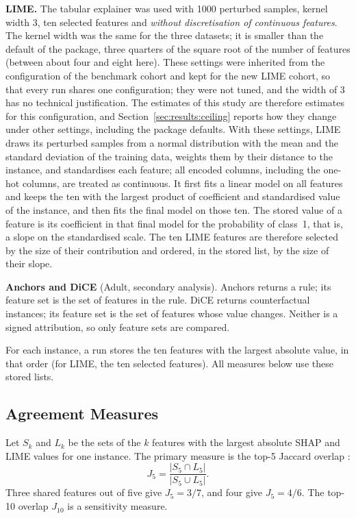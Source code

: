 \textbf{LIME.} The tabular explainer \cite{ribeiro2016why} was used with 1000 perturbed
samples, kernel width 3, ten selected features and \emph{without discretisation of
continuous features}. The kernel width was the same for the three datasets; it is smaller
than the default of the package, three quarters of the square root of the number of
features (between about four and eight here). These settings were inherited from the
configuration of the benchmark cohort and kept for the new LIME cohort, so that every run
shares one configuration; they were not tuned, and the width of 3 has no technical
justification. The estimates of this study are therefore estimates for this configuration,
and Section~\ref{sec:results:ceiling} reports how they change under other settings,
including the package defaults. With these settings, LIME draws its perturbed samples from a normal distribution
with the mean and the standard deviation of the training data, weights them by their
distance to the instance, and standardises each feature; all encoded columns, including
the one-hot columns, are treated as continuous. It first fits a linear model on all
features and keeps the ten with the largest product of coefficient and standardised value
of the instance, and then fits the final model on those ten. The stored value of a
feature is its coefficient in that final model for the probability of class~1, that is, a
slope on the standardised scale. The ten LIME features are therefore selected by the size
of their contribution and ordered, in the stored list, by the size of their slope.

\textbf{Anchors and DiCE} (Adult, secondary analysis). Anchors
\cite{ribeiro2018anchors} returns a rule; its feature set is the set of features in the
rule. DiCE \cite{mothilal2020dice} returns counterfactual instances; its feature set is
the set of features whose value changes. Neither is a signed attribution, so only
feature sets are compared.

For each instance, a run stores the ten features with the largest absolute value, in
that order (for LIME, the ten selected features). All measures below use these stored
lists.

\subsection{Agreement Measures}

Let $S_k$ and $L_k$ be the sets of the $k$ features with the largest absolute SHAP and
LIME values for one instance. The primary measure is the top-5 Jaccard overlap
\cite{jaccard1912distribution}:
\begin{equation}
J_5 = \frac{|S_5 \cap L_5|}{|S_5 \cup L_5|}.
\label{eq:jaccard}
\end{equation}
Three shared features out of five give $J_5 = 3/7$, and four give $J_5 = 4/6$. The top-10 overlap $J_{10}$ is a sensitivity measure.

